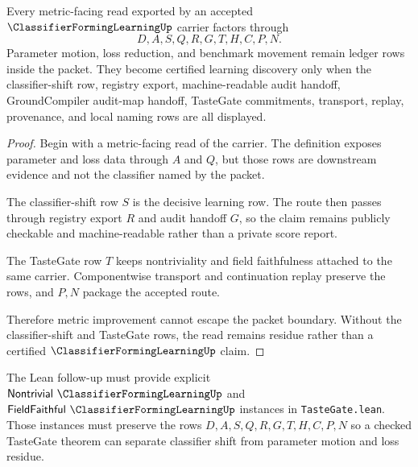 \begin{theorem}
\label{thm:classifier-forming-learning-metric-nonescape}
Every metric-facing read exported by an accepted
$\ClassifierFormingLearningUp$ carrier factors through
$$
D,A,S,Q,R,G,T,H,C,P,N .
$$
Parameter motion, loss reduction, and benchmark movement remain ledger rows
inside the packet. They become certified learning discovery only when the
classifier-shift row, registry export, machine-readable audit handoff,
GroundCompiler audit-map handoff, TasteGate commitments, transport, replay,
provenance, and local naming rows are all displayed.
\end{theorem}
\begin{proof}
Begin with a metric-facing read of the carrier. The definition exposes
parameter and loss data through $A$ and $Q$, but those rows are downstream
evidence and not the classifier named by the packet.

The classifier-shift row $S$ is the decisive learning row. The route then
passes through registry export $R$ and audit handoff $G$, so the claim remains
publicly checkable and machine-readable rather than a private score report.

The TasteGate row $T$ keeps nontriviality and field faithfulness attached to
the same carrier. Componentwise transport and continuation replay preserve
the rows, and $P,N$ package the accepted route.

Therefore metric improvement cannot escape the packet boundary. Without the
classifier-shift and TasteGate rows, the read remains residue rather than a
certified $\ClassifierFormingLearningUp$ claim.
\end{proof}



The Lean follow-up must provide explicit
$\mathsf{Nontrivial}\ \ClassifierFormingLearningUp$ and
$\mathsf{FieldFaithful}\ \ClassifierFormingLearningUp$ instances in
\texttt{TasteGate.lean}. Those instances must preserve the rows
$D,A,S,Q,R,G,T,H,C,P,N$ so a checked TasteGate theorem can separate classifier
shift from parameter motion and loss residue.

